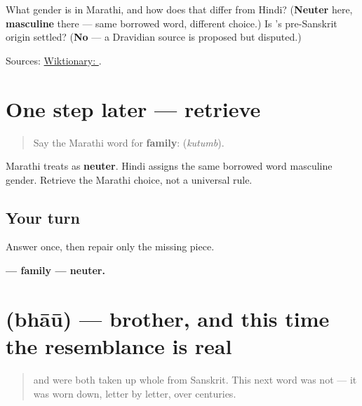 \begin{tcolorbox}[breakable,colback=teal!4,colframe=teal!35!black,title={Before you move on}]
What gender is \textbf{} in Marathi, and how does that differ from Hindi? (\textbf{Neuter} here, \textbf{masculine} there — same borrowed word, different choice.) Is \textbf{}'s pre-Sanskrit origin settled? (\textbf{No} — a Dravidian source is proposed but disputed.)

Sources: \href{https://en.wiktionary.org/wiki/\%E0\%A4\%95\%E0\%A5\%81\%E0\%A4\%9F\%E0\%A5\%81\%E0\%A4\%82\%E0\%A4\%AC}{Wiktionary: }.
\end{tcolorbox}
\section[\texorpdfstring{\mr{कुटुंब} (kutumb)}{कुटुंब (kutumb)}]{One step later — retrieve }

\label{lesson:MR-R11-kutumb-r1}



\begin{quote}
Say the Marathi word for \textbf{family}: \textbf{} (\emph{kutumb}).
\end{quote}

\begin{grammarlens}[title={What you've built}]
Marathi treats \textbf{} as \textbf{neuter}. Hindi assigns the same borrowed word masculine gender. Retrieve the Marathi choice, not a universal rule.
\end{grammarlens}

\subsection*{Your turn}
Answer once, then repair only the missing piece.

\begin{tcolorbox}[breakable,colback=teal!4,colframe=teal!35!black,title={Before you move on}]
\textbf{ — family — neuter.}
\end{tcolorbox}
\section[\texorpdfstring{\mr{भाऊ} (bhāū)}{भाऊ (bhāū)}]{ (bhāū) — brother, and this time the resemblance is real}

\label{lesson:MR-C11-bhau}



\begin{quote}
\textbf{} and \textbf{} were both taken up whole from Sanskrit. This next word was not — it was worn down, letter by letter, over centuries.
\end{quote}

